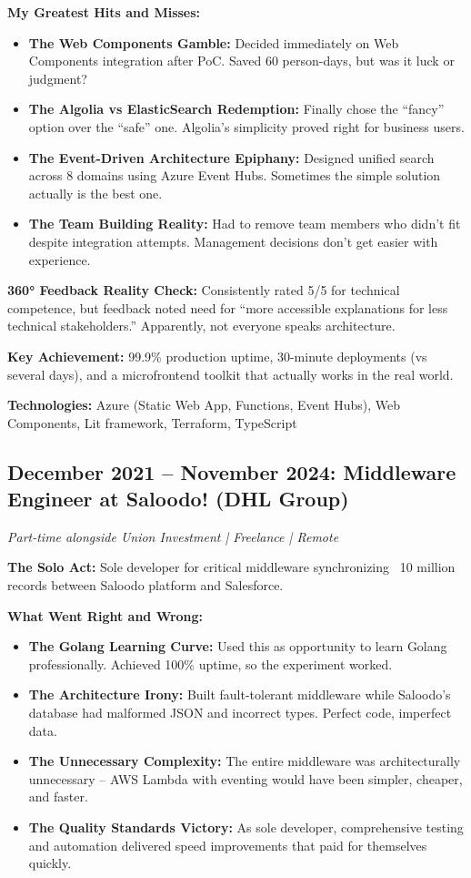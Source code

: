 \documentclass[11pt,a4paper]{article}
\begin{document}
\textbf{My Greatest Hits and Misses:}
\begin{itemize}[leftmargin=15pt, topsep=0pt, itemsep=2pt]
\item \textbf{The Web Components Gamble:} Decided immediately on Web Components integration after PoC. Saved 60 person-days, but was it luck or judgment?
\item \textbf{The Algolia vs ElasticSearch Redemption:} Finally chose the ``fancy'' option over the ``safe'' one. Algolia's simplicity proved right for business users.
\item \textbf{The Event-Driven Architecture Epiphany:} Designed unified search across 8 domains using Azure Event Hubs. Sometimes the simple solution actually is the best one.
\item \textbf{The Team Building Reality:} Had to remove team members who didn't fit despite integration attempts. Management decisions don't get easier with experience.
\end{itemize}

\textbf{360° Feedback Reality Check:} Consistently rated 5/5 for technical competence, but feedback noted need for ``more accessible explanations for less technical stakeholders.'' Apparently, not everyone speaks architecture.

\textbf{Key Achievement:} 99.9\% production uptime, 30-minute deployments (vs several days), and a microfrontend toolkit that actually works in the real world.

\textbf{Technologies:} Azure (Static Web App, Functions, Event Hubs), Web Components, Lit framework, Terraform, TypeScript

\vspace{6pt}

\subsection{December 2021 -- November 2024: Middleware Engineer at Saloodo! (DHL Group)}
\textit{Part-time alongside Union Investment | Freelance | Remote}

\textbf{The Solo Act:} Sole developer for critical middleware synchronizing ~10 million records between Saloodo platform and Salesforce.

\textbf{What Went Right and Wrong:}
\begin{itemize}[leftmargin=15pt, topsep=0pt, itemsep=2pt]
\item \textbf{The Golang Learning Curve:} Used this as opportunity to learn Golang professionally. Achieved 100\% uptime, so the experiment worked.
\item \textbf{The Architecture Irony:} Built fault-tolerant middleware while Saloodo's database had malformed JSON and incorrect types. Perfect code, imperfect data.
\item \textbf{The Unnecessary Complexity:} The entire middleware was architecturally unnecessary -- AWS Lambda with eventing would have been simpler, cheaper, and faster.
\item \textbf{The Quality Standards Victory:} As sole developer, comprehensive testing and automation delivered speed improvements that paid for themselves quickly.
\end{itemize}
\end{document}
